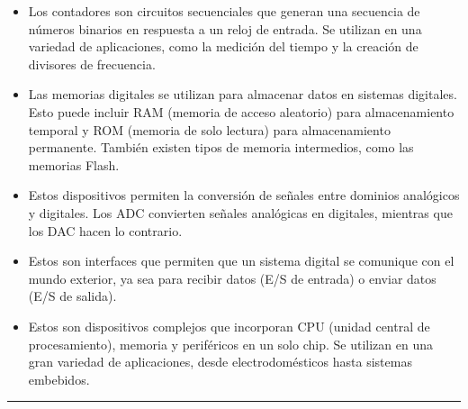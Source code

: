 \documentclass[letterpaper,10pt,spanish]{sphinxmanual}
\begin{document}
\begin{itemize}
\item {} 
\sphinxAtStartPar
{}  Los contadores son circuitos secuenciales que generan una secuencia de números binarios en respuesta a un reloj de entrada. Se utilizan en una variedad de aplicaciones, como la medición del tiempo y la creación de divisores de frecuencia.

\item {} 
\sphinxAtStartPar
{} Las memorias digitales se utilizan para almacenar datos en sistemas digitales. Esto puede incluir RAM (memoria de acceso aleatorio) para almacenamiento temporal y ROM (memoria de solo lectura) para almacenamiento permanente. También existen tipos de memoria intermedios, como las memorias Flash.

\item {} 
\sphinxAtStartPar
{} Estos dispositivos permiten la conversión de señales entre dominios analógicos y digitales. Los ADC convierten señales analógicas en digitales, mientras que los DAC hacen lo contrario.

\item {} 
\sphinxAtStartPar
{} Estos son interfaces que permiten que un sistema digital se comunique con el mundo exterior, ya sea para recibir datos (E/S de entrada) o enviar datos (E/S de salida).

\item {} 
\sphinxAtStartPar
{} Estos son dispositivos complejos que incorporan CPU (unidad central de procesamiento), memoria y periféricos en un solo chip. Se utilizan en una gran variedad de aplicaciones, desde electrodomésticos hasta sistemas embebidos.

\end{itemize}


\bigskip\hrule\bigskip
\end{document}
